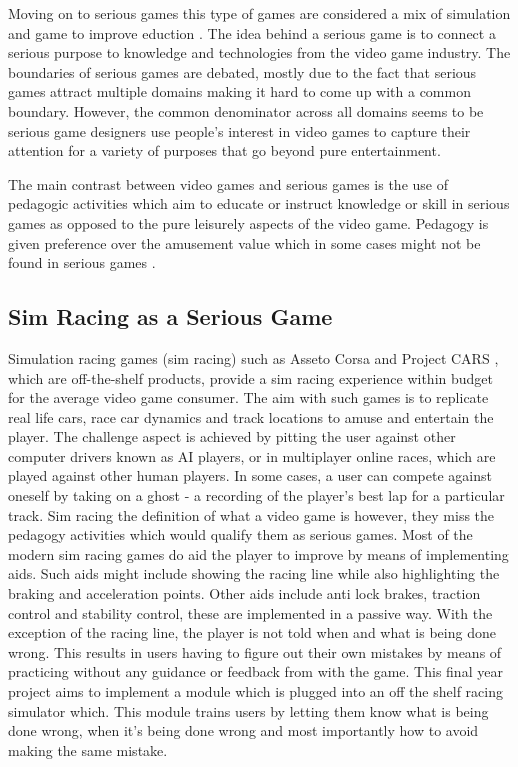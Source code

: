 \documentclass{article}
\begin{document}
Moving on to serious games this type of games are considered a mix of simulation and game to improve eduction \cite{abt1970}. The idea behind a serious game is to connect a serious purpose to knowledge and technologies from the video game industry\cite{michael2005serious}. The boundaries of serious games are debated, mostly due to the fact that serious games attract multiple domains making it hard to come up with a common boundary. However, the common denominator across all domains seems to be serious game designers use people's interest in video games to capture their attention for a variety of purposes that go beyond pure entertainment\cite{djaouti2011classifying}.

The main contrast between video games and serious games is the use of pedagogic activities which aim to educate or instruct knowledge or skill \cite{zyda2005visual} in serious games as opposed to the pure leisurely aspects of the video game. Pedagogy is given preference over the amusement value which in some cases might not be found in serious games \cite{zyda2005visual}.

\subsection{Sim Racing as a Serious Game}

Simulation racing games (sim racing) such as Asseto Corsa \cite{aqqalla1} and Project CARS \cite{aqqalla2}, which are off-the-shelf products, provide a sim racing experience within budget for the average video game consumer. The aim with such games is to replicate real life cars, race car dynamics and track locations to amuse and entertain the player. The challenge aspect is achieved by pitting the user against other computer drivers known as AI players, or in multiplayer online races, which are played against other human players. In some cases, a user can compete against oneself by taking on a ghost - a recording of the player's best lap for a particular track. Sim racing the definition of what a video game is however, they miss the pedagogy activities which would qualify them as serious games. Most of the modern sim racing games do aid the player to improve by means of implementing aids. Such aids might include showing the racing line while also highlighting the braking and acceleration points. Other aids include anti lock brakes, traction control and stability control, these are implemented in a passive way. With the exception of the racing line, the player is not told when and what is being done wrong. This results in users having to figure out their own mistakes by means of practicing without any guidance or feedback from with the game. This final year project aims to implement a module which is plugged into an off the shelf racing simulator which. This module trains users by letting them know what is being done wrong, when it's being done wrong and most importantly how to avoid making the same mistake.
\end{document}
